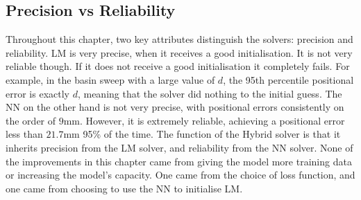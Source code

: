 \subsection{Precision vs Reliability} Throughout this chapter, two key attributes distinguish the solvers: precision and reliability. LM is very precise, when it receives a good initialisation. It is not very reliable though. If it does not receive a good initialisation it completely fails. For example, in the basin sweep with a large value of $d$, the 95th percentile positional error is exactly $d$, meaning that the solver did nothing to the initial guess. The NN on the other hand is not very precise, with positional errors consistently on the order of $9$mm. However, it is extremely reliable, achieving a positional error less than $21.7$mm 95\% of the time. The function of the Hybrid solver is that it inherits precision from the LM solver, and reliability from the NN solver. None of the improvements in this chapter came from giving the model more training data or increasing the model's capacity. One came from the choice of loss function, and one came from choosing to use the NN to initialise LM.
